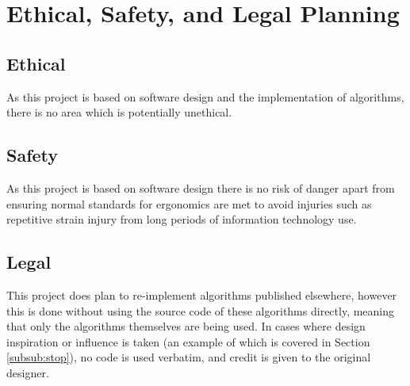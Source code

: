 \section{Ethical, Safety, and Legal Planning}

\subsection{Ethical}
As this project is based on software design and the implementation of algorithms, there is no area which is potentially unethical.

\subsection{Safety}
As this project is based on software design there is no risk of danger apart from ensuring normal standards for ergonomics are met to avoid injuries such as repetitive strain injury from long periods of information technology use.

\subsection{Legal}
This project does plan to re-implement algorithms published elsewhere, however this is done without using the source code of these algorithms directly, meaning that only the algorithms themselves are being used. In cases where design inspiration or influence is taken (an example of which is covered in Section \ref{subsub:stop}), no code is used verbatim, and credit is given to the original designer. 